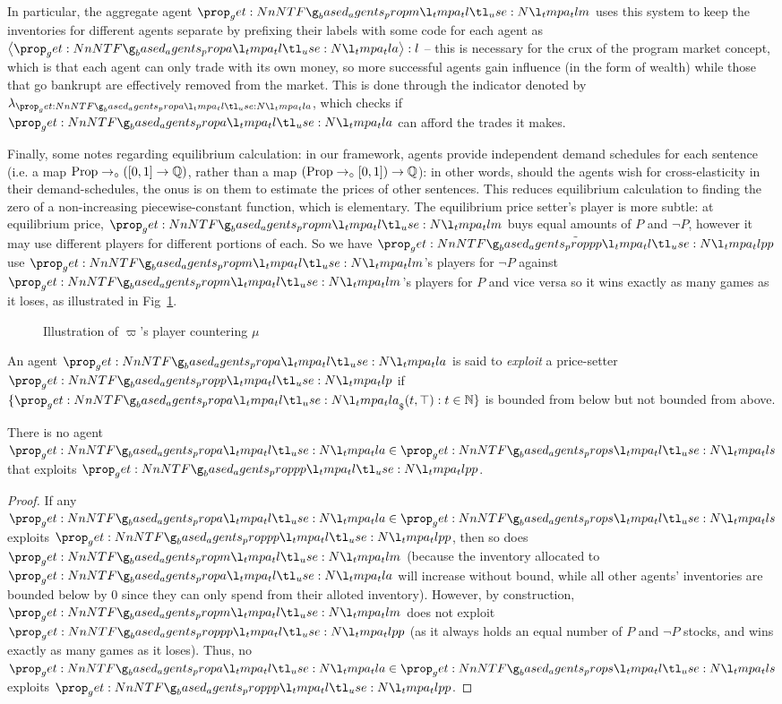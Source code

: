 \documentclass{article}
\begin{document}
In particular, the aggregate agent $\agent[m]$ uses this system to keep the inventories for different agents separate by prefixing their labels with some code for each agent as $\concat{\code{\agent}}{l}$ -- this is necessary for the crux of the program market concept, which is that each agent can only trade with its own money, so more successful agents gain influence (in the form of wealth) while those that go bankrupt are effectively removed from the market. This is done through the indicator denoted by $\lambda_{\agent}$, which checks if $\agent$ can afford the trades it makes.

Finally, some notes regarding equilibrium calculation: in our framework, agents provide independent demand schedules for each sentence (i.e. a map $\operatorname{Prop}\to_\circ([0,1]\to\mathbb{Q})$, rather than a map $(\operatorname{Prop}\to_\circ[0,1])\to\mathbb{Q}$): in other words, should the agents wish for cross-elasticity in their demand-schedules, the onus is on them to estimate the prices of other sentences. This reduces equilibrium calculation to finding the zero of a non-increasing piecewise-constant function, which is elementary. The equilibrium price setter's player is more subtle: at equilibrium price, $\agent[m]$ buys equal amounts of $P$ and $\lnot P$, however it may use different players for different portions of each. So we have $\player[pp]$ use $\agent[m]$'s players for $\lnot P$ against $\agent[m]$'s players for $P$ and vice versa so it wins exactly as many games as it loses, as illustrated in Fig~\ref{fig:matchup}.

\begin{figure}
    \centering
    
    \caption{Illustration of $\varpi$'s player countering $\mu$}
    \label{fig:matchup}
\end{figure}

\begin{definition}[Exploitation]
    An agent $\agent$ is said to \emph{exploit} a price-setter $\agent[p]$ if $\{\inventory(t,\top):t\in\Nats\}$ is bounded from below but not bounded from above.
    \label{def:exploit}
\end{definition}

\begin{lemma}[Inexploitabity]
    There is no agent $\agent\in\agent[s]$ that exploits $\agent[pp]$.
    \label{lem:inexploit}
\end{lemma}
\begin{proof}
    If any $\agent\in\agent[s]$ exploits $\agent[pp]$, then so does $\agent[m]$ (because the inventory allocated to $\agent$ will increase without bound, while all other agents' inventories are bounded below by 0 since they can only spend from their alloted inventory). However, by construction, $\agent[m]$ does not exploit $\agent[pp]$ (as it always holds an equal number of $P$ and $\lnot P$ stocks, and wins exactly as many games as it loses). Thus, no $\agent\in\agent[s]$ exploits $\agent[pp]$.
\end{proof}
\end{document}
